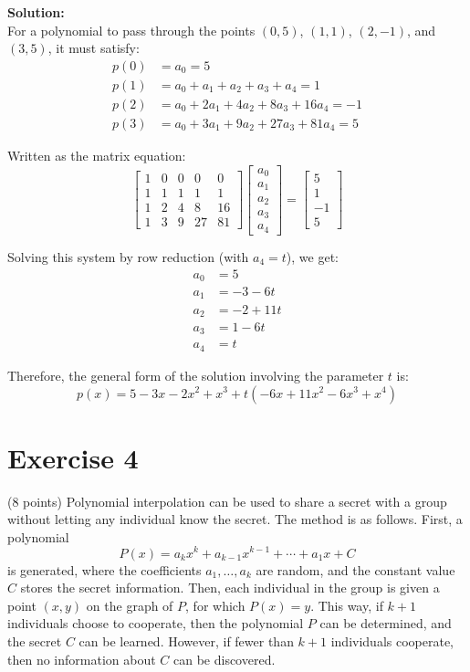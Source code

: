 \documentclass{article}
\begin{document}
\textbf{Solution:} \\

For a polynomial to pass through the points $(0,5)$, $(1,1)$, $(2,-1)$, and $(3,5)$, it must satisfy:
\begin{align*}
p(0) &= a_0 = 5\\
p(1) &= a_0 + a_1 + a_2 + a_3 + a_4 = 1\\
p(2) &= a_0 + 2a_1 + 4a_2 + 8a_3 + 16a_4 = -1\\
p(3) &= a_0 + 3a_1 + 9a_2 + 27a_3 + 81a_4 = 5
\end{align*}

Written as the matrix equation:
\[
\begin{bmatrix} 
1 & 0 & 0 & 0 & 0 \\
1 & 1 & 1 & 1 & 1 \\
1 & 2 & 4 & 8 & 16 \\
1 & 3 & 9 & 27 & 81
\end{bmatrix} 
\begin{bmatrix} a_0 \\ a_1 \\ a_2 \\ a_3 \\ a_4 \end{bmatrix} = 
\begin{bmatrix} 5 \\ 1 \\ -1 \\ 5 \end{bmatrix}
\]

Solving this system by row reduction (with $a_4 = t$), we get:
\begin{align*}
a_0 &= 5\\
a_1 &= -3 - 6t\\
a_2 &= -2 + 11t\\
a_3 &= 1 - 6t\\
a_4 &= t
\end{align*}

Therefore, the general form of the solution involving the parameter $t$ is:
\[
p(x) = 5 - 3x - 2x^2 + x^3 + t(-6x + 11x^2 - 6x^3 + x^4)
\]

\newpage

\section*{Exercise 4}
(8 points) Polynomial interpolation can be used to share a secret with a group without letting any individual know the secret. The method is as follows. First, a polynomial
\[
P(x) = a_k x^k + a_{k-1}x^{k-1} + \cdots + a_1 x + C
\]
is generated, where the coefficients $a_1, \ldots, a_k$ are random, and the constant value $C$ stores the secret information. Then, each individual in the group is given a point $(x, y)$ on the graph of $P$, for which $P(x) = y$. This way, if $k + 1$ individuals choose to cooperate, then the polynomial $P$ can be determined, and the secret $C$ can be learned. However, if fewer than $k + 1$ individuals cooperate, then no information about $C$ can be discovered. \\
\end{document}
